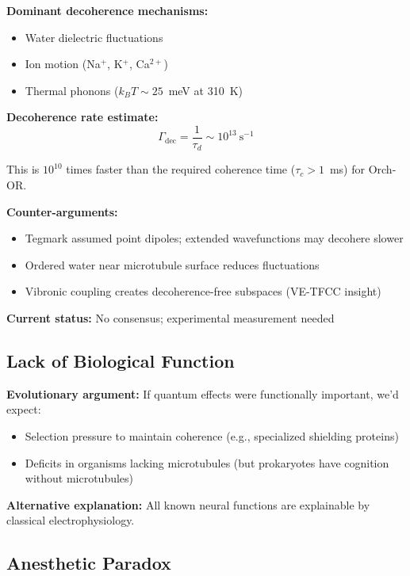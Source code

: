\textbf{Dominant decoherence mechanisms:}
\begin{itemize}
\item Water dielectric fluctuations
\item Ion motion (Na$^+$, K$^+$, Ca$^{2+}$)
\item Thermal phonons ($k_B T \sim 25$~meV at 310~K)
\end{itemize}

\textbf{Decoherence rate estimate:}
\begin{equation}
\Gamma_{\mathrm{dec}} = \frac{1}{\tau_d} \sim 10^{13}\ \mathrm{s}^{-1}
\end{equation}

This is $10^{10}$ times faster than the required coherence time ($\tau_c > 1$~ms) for Orch-OR.

\textbf{Counter-arguments:}
\begin{itemize}
\item Tegmark assumed point dipoles; extended wavefunctions may decohere slower
\item Ordered water near microtubule surface reduces fluctuations
\item Vibronic coupling creates decoherence-free subspaces (VE-TFCC insight)
\end{itemize}

\textbf{Current status:} No consensus; experimental measurement needed

\subsection{Lack of Biological Function}

\textbf{Evolutionary argument:} If quantum effects were functionally important, we'd expect:
\begin{itemize}
\item Selection pressure to maintain coherence (e.g., specialized shielding proteins)
\item Deficits in organisms lacking microtubules (but prokaryotes have cognition without microtubules)
\end{itemize}

\textbf{Alternative explanation:} All known neural functions are explainable by classical electrophysiology.

\subsection{Anesthetic Paradox}


